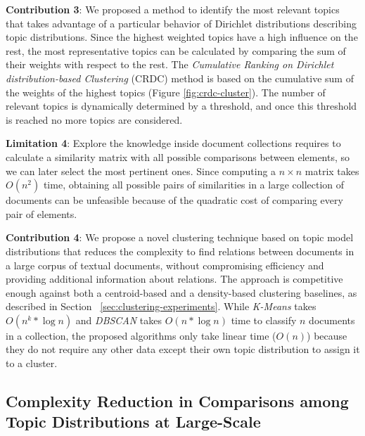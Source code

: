 \textbf{Contribution 3}: We proposed a method to identify the most relevant topics that takes advantage of a particular behavior of Dirichlet distributions describing topic distributions. Since the highest weighted topics have a high influence on the rest, the most representative topics can be calculated by comparing the sum of their weights with respect to the rest. The \textit{Cumulative Ranking on Dirichlet distribution-based Clustering} (CRDC) method is based on the cumulative sum of the weights of the highest topics (Figure \ref{fig:crdc-cluster}). The number of relevant topics is dynamically determined by a threshold, and once this threshold is reached no more topics are considered. 

\textbf{Limitation 4}: Explore the knowledge inside document collections requires to calculate a similarity matrix with all possible comparisons between elements, so we can later select the most pertinent ones. Since computing a $n \times n$ matrix takes $O(n^2)$ time, obtaining all possible pairs of similarities in a large collection of documents can be unfeasible because of the quadratic cost of comparing every pair of elements.

\textbf{Contribution 4}: We propose a novel clustering technique based on topic model distributions that reduces the complexity to find relations between documents in a large corpus of textual documents, without compromising efficiency and providing additional information about relations. The approach is competitive enough against both a centroid-based and a density-based clustering baselines, as described in Section ~\ref{sec:clustering-experiments}. While \textit{K-Means} takes $O(n^k * \log{n})$ and \textit{DBSCAN} takes $O(n * \log{n})$ time to classify $n$ documents in a collection, the proposed algorithms only take linear time ($O(n)$) because they do not require any other data except their own topic distribution to assign it to a cluster.

\subsection{Complexity Reduction in Comparisons among Topic Distributions at Large-Scale}

